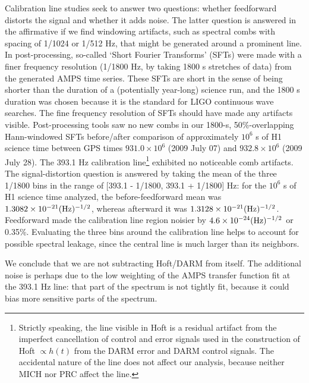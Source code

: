 Calibration line studies seek to answer two questions: whether feedforward distorts the signal and whether it adds noise. The latter question is answered in the affirmative if we find windowing artifacts, such as spectral combs with spacing of 1/1024 or 1/512 Hz, that might be generated around a prominent line. In post-processing, so-called `Short Fourier Transforms' (SFTs) were made with a finer frequency resolution (1/1800 Hz, by taking 1800 s stretches of data) from the generated AMPS time series. These SFTs are short in the sense of being shorter than the duration of a (potentially year-long) science run, and the 1800 s duration was chosen because it is the standard for LIGO continuous wave searches. The fine frequency resolution of SFTs should have made any artifacts visible. Post-processing tools saw no new combs in our 1800-s, 50\%-overlapping Hann-windowed SFTs before/after comparison of  approximately $10^6$ s of H1 science time between GPS times $931.0 \times 10^6$ (2009 July 07) and $932.8 \times 10^6$ (2009 July 28). The 393.1 Hz calibration line\footnote{Strictly speaking, the line visible in Hoft is a residual artifact from the imperfect cancellation of control and error signals used in the construction of Hoft $\propto h(t)$ from the DARM error and DARM control signals. The accidental nature of the line does not affect our analysis, because neither MICH nor PRC affect the line.} exhibited no noticeable comb artifacts. The signal-distortion question is answered by taking the mean of the three 1/1800 bins in the range of [393.1 - 1/1800, 393.1 + 1/1800] Hz: for the $10^6$ s of H1 science time analyzed, the before-feedforward mean was $1.3082 \times 10^{-21} (\textup{Hz})^{-1/2}$, whereas afterward it was $1.3128 \times 10^{-21} (\textup{Hz})^{-1/2}$. Feedforward made the calibration line region noisier by $4.6 \times 10^{-24} (\textup{Hz})^{-1/2}$ or 0.35\%. Evaluating the three bins around the calibration line helps to account for possible spectral leakage, since the central line is much larger than its neighbors.  

We conclude that we are not subtracting Hoft/DARM from itself. The additional noise is perhaps due to the low weighting of the AMPS transfer function fit at the 393.1 Hz line: that part of the spectrum is not tightly fit, because it could bias more sensitive parts of the spectrum.

